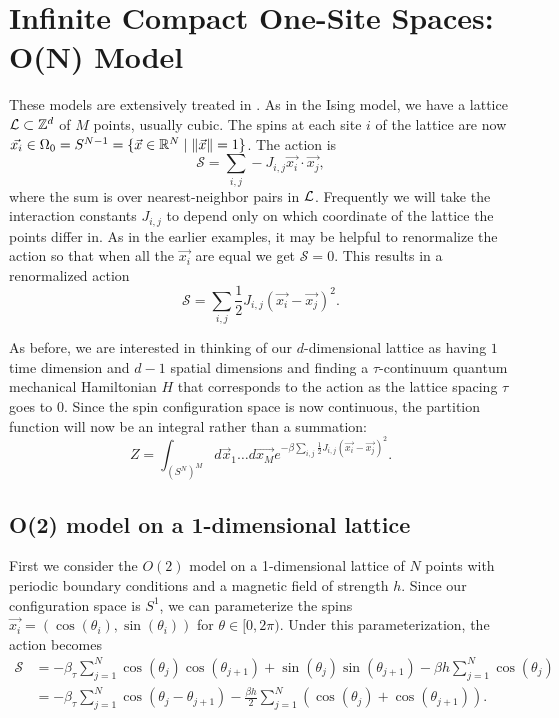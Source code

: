 \documentclass[11pt,reqno]{amsart}
\numberwithin{equation}{section}
\begin{document}
	\section{Infinite Compact One-Site Spaces: O(N) Model}
	
	These models are extensively treated in \cite{FradkinSusskind78,HamerKogutSusskind79,KogutGaugeSummary}. 
	As in the Ising model, we have a lattice $\mathcal{L} \subset \mathbb{Z}^d$ of $M$ points, usually cubic. 
	The spins at each site $i$ of the lattice are now $\vec{x_i} \in \Omega_0=S^{N-1} = \{\vec{x} \in \mathbb{R}^{N} \mid \|\vec{x}\|=1 \}$. 
	The action is
	\[\mathcal{S}=\sum_{i,j} -J_{i,j}\vec{x_i}\cdot\vec{x_j}, \] where the sum is over nearest-neighbor pairs in $\mathcal{L}$.
	Frequently we will take the interaction constants $J_{i,j}$ to depend only on which coordinate of the lattice the points differ in.
	As in the earlier examples, it may be helpful to renormalize the action so that when all the $\vec{x_i}$ are equal we get $\mathcal{S}=0$. 
	This results in a renormalized action
	\[\mathcal{S}=\sum_{i,j}\frac{1}{2} J_{i,j}(\vec{x_i}-\vec{x_j})^2. \]
	
	As before, we are interested in thinking of our $d$-dimensional lattice as having $1$ time dimension and $d-1$ spatial dimensions and finding a $\tau$-continuum quantum mechanical Hamiltonian $H$ that corresponds to the action as the lattice spacing $\tau$ goes to $0$.
	Since the spin configuration space is now continuous, the partition function will now be an integral rather than a summation:
	\[ Z=\int_{(S^N)^M} d\vec{x}_1\ldots d\vec{x_M} e^{-\beta\sum_{i,j}\frac{1}{2} J_{i,j}(\vec{x_i}-\vec{x_j})^2}. \]
	
	\subsection{O(2) model on a 1-dimensional lattice}
	
	First we consider the $O(2)$ model on a 1-dimensional lattice of $N$ points with periodic boundary conditions and a magnetic field of strength $h$.
	Since our configuration space is $S^1$, we can parameterize the spins $\vec{x_i}=(\cos(\theta_i),\sin(\theta_i))$ for $\theta \in [0,2\pi)$. 
	Under this parameterization, the action becomes
	\begin{align*}
		 \mathcal{S} &= -\beta_\tau \sum_{j=1}^N \cos(\theta_j)\cos(\theta_{j+1})+\sin(\theta_j)\sin(\theta_{j+1}) - \beta h  \sum_{j=1}^N \cos(\theta_j)\\
			&=  - \beta_\tau \sum_{j=1}^N \cos(\theta_j-\theta_{j+1}) - \frac{\beta h}{2}  \sum_{j=1}^N \left(\cos(\theta_j)+\cos(\theta_{j+1})\right). 
	\end{align*}
	
\end{document}

